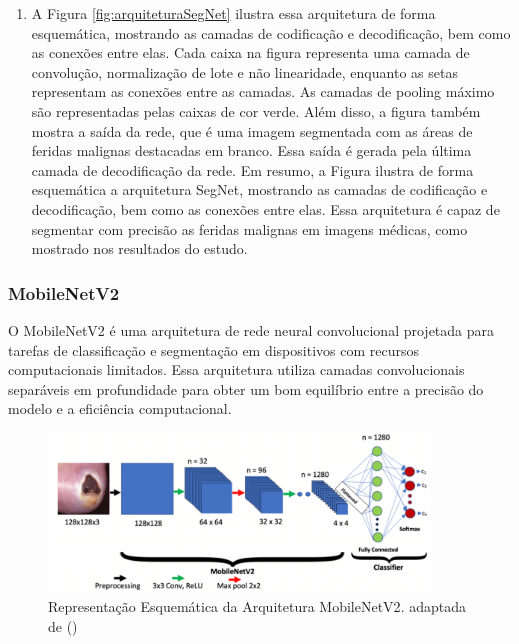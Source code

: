         \begin{enumerate}
            \item A Figura \ref{fig:arquiteturaSegNet} ilustra essa arquitetura de forma esquemática, mostrando as camadas de codificação e decodificação, bem como as conexões entre elas. Cada caixa na figura representa uma camada de convolução, normalização de lote e não linearidade, enquanto as setas representam as conexões entre as camadas. As camadas de pooling máximo são representadas pelas caixas de cor verde. Além disso, a figura também mostra a saída da rede, que é uma imagem segmentada com as áreas de feridas malignas destacadas em branco. Essa saída é gerada pela última camada de decodificação da rede.
            Em resumo, a Figura ilustra de forma esquemática a arquitetura \ac{SegNet}, mostrando as camadas de codificação e decodificação, bem como as conexões entre elas. Essa arquitetura é capaz de segmentar com precisão as feridas malignas em imagens médicas, como mostrado nos resultados do estudo.
        \end{enumerate}

    
    \subsubsection{MobileNetV2}

        O \ac{MobileNetV2} é uma arquitetura de rede neural convolucional projetada para tarefas de classificação e segmentação em dispositivos com recursos computacionais limitados. Essa arquitetura utiliza camadas convolucionais separáveis em profundidade para obter um bom equilíbrio entre a precisão do modelo e a eficiência computacional.
    
            \begin{figure}[H]
                \centering
                \includegraphics[width=0.9\textwidth]{img/arquitetura_MobileNetV2.png}
                \caption{Representação Esquemática da Arquitetura \ac{MobileNetV2}. adaptada de (\cite{akay2021deep})}
                \label{fig:arquiteturaMobileNetV2}
            \end{figure}
            
